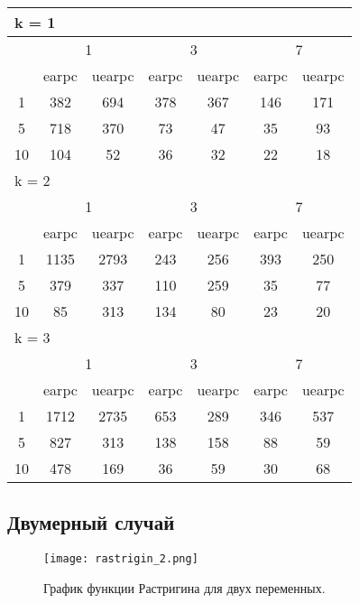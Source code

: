 \begin{table}
 \begin{tabular}{|*7{c|}}
\hline
\multicolumn{7}{|l|}{k = 1} \\
\hline
\multirow{2}{*}{\diagbox{$\mu$}{$\lambda$}} & \multicolumn{2}{c|}{1} & \multicolumn{2}{c|}{3} & \multicolumn{2}{c|}{7} \\
\cline{2-7}
 & earpc & uearpc & earpc & uearpc & earpc & uearpc \\
\hline
1 & 382 & 694 & 378 & 367 & 146 & 171 \\
\hline
5 & 718 & 370 & 73 & 47 & 35 & 93 \\
\hline
10 & 104 & 52 & 36 & 32 & 22 & 18 \\
\hline
\multicolumn{7}{|l|}{k = 2} \\
\hline
\multirow{2}{*}{\diagbox{$\mu$}{$\lambda$}} & \multicolumn{2}{c|}{1} & \multicolumn{2}{c|}{3} & \multicolumn{2}{c|}{7} \\
\cline{2-7}
 & earpc & uearpc & earpc & uearpc & earpc & uearpc \\
\hline
1 & 1135 & 2793 & 243 & 256 & 393 & 250 \\
\hline
5 & 379 & 337 & 110 & 259 & 35 & 77 \\
\hline
10 & 85 & 313 & 134 & 80 & 23 & 20 \\
\hline
\multicolumn{7}{|l|}{k = 3} \\
\hline
\multirow{2}{*}{\diagbox{$\mu$}{$\lambda$}} & \multicolumn{2}{c|}{1} & \multicolumn{2}{c|}{3} & \multicolumn{2}{c|}{7} \\
\cline{2-7}
 & earpc & uearpc & earpc & uearpc & earpc & uearpc \\
\hline
1 & 1712 & 2735 & 653 & 289 & 346 & 537 \\
\hline
5 & 827 & 313 & 138 & 158 & 88 & 59 \\
\hline
10 & 478 & 169 & 36 & 59 & 30 & 68 \\
\hline
\end{tabular}
\end{table}


\subsection{Двумерный случай}

\begin{figure}
    \centering
    \texttt{[image: rastrigin\_2.png]}
    \caption{График функции Растригина для двух переменных.}
    \label{rastrigin_plot}
\end{figure}

